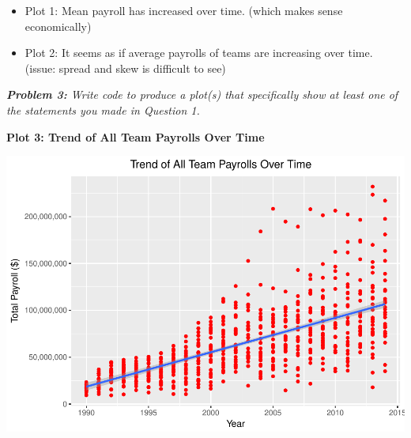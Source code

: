\documentclass[]{article}
\newenvironment{Shaded}{\begin{snugshade}}{\end{snugshade}}
\newcommand{\KeywordTok}[1]{\textcolor[rgb]{0.13,0.29,0.53}{\textbf{#1}}}
\newcommand{\DataTypeTok}[1]{\textcolor[rgb]{0.13,0.29,0.53}{#1}}
\newcommand{\DecValTok}[1]{\textcolor[rgb]{0.00,0.00,0.81}{#1}}
\newcommand{\FloatTok}[1]{\textcolor[rgb]{0.00,0.00,0.81}{#1}}
\newcommand{\StringTok}[1]{\textcolor[rgb]{0.31,0.60,0.02}{#1}}
\newcommand{\CommentTok}[1]{\textcolor[rgb]{0.56,0.35,0.01}{\textit{#1}}}
\newcommand{\OperatorTok}[1]{\textcolor[rgb]{0.81,0.36,0.00}{\textbf{#1}}}
\newcommand{\NormalTok}[1]{#1}
\providecommand{\tightlist}{%
  \setlength{\itemsep}{0pt}\setlength{\parskip}{0pt}}
\begin{document}
\begin{itemize}
\tightlist
\item
  Plot 1: Mean payroll has increased over time. (which makes sense
  economically)
\item
  Plot 2: It seems as if average payrolls of teams are increasing over
  time. (issue: spread and skew is difficult to see)
\end{itemize}

\emph{\textbf{Problem 3:} Write code to produce a plot(s) that
specifically show at least one of the statements you made in Question
1.}

\textbf{Plot 3: Trend of All Team Payrolls Over Time}

\begin{Shaded}
\end{Shaded}

\includegraphics{p2_files/figure-latex/unnamed-chunk-7-1.pdf}
\end{document}

